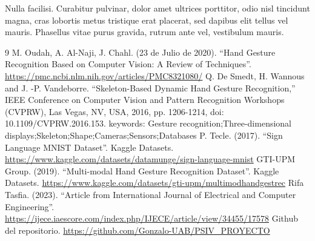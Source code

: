 \documentclass[10pt,a4paper,twocolumn,twoside]{article}
\begin{document}
Nulla facilisi. Curabitur pulvinar, dolor amet ultrices porttitor, odio nisl tincidunt magna, cras lobortis metus tristique erat placerat, sed dapibus elit tellus vel mauris. Phasellus vitae purus gravida, rutrum ante vel, vestibulum mauris. 


\begin{thebibliography}{9}
 M. Oudah, A. Al-Naji, J. Chahl. (23 de Julio de 2020). \newblock ``Hand Gesture Recognition Based on Computer Vision: A Review of Techniques''. \newblock \url{https://pmc.ncbi.nlm.nih.gov/articles/PMC8321080/}
 Q. De Smedt, H. Wannous and J. -P. Vandeborre. \newblock ``Skeleton-Based Dynamic Hand Gesture Recognition,''  IEEE Conference on Computer Vision and Pattern Recognition Workshops (CVPRW), Las Vegas, NV, USA, 2016, pp. 1206-1214, doi: 10.1109/CVPRW.2016.153. keywords: {Gesture recognition;Three-dimensional displays;Skeleton;Shape;Cameras;Sensors;Databases}
 P. Tecle. (2017). \newblock ``Sign Language MNIST Dataset''. \newblock Kaggle Datasets. \newblock \url{https://www.kaggle.com/datasets/datamunge/sign-language-mnist}
 GTI-UPM Group. (2019). \newblock ``Multi-modal Hand Gesture Recognition Dataset''. \newblock Kaggle Datasets. \newblock \url{https://www.kaggle.com/datasets/gti-upm/multimodhandgestrec}
 Rifa Tasfia. (2023). \newblock ``Article from International Journal of Electrical and Computer Engineering''. \newblock \url{https://ijece.iaescore.com/index.php/IJECE/article/view/34455/17578}
 Github del repositorio. \url{https://github.com/Gonzalo-UAB/PSIV_PROYECTO}
\end{thebibliography}
\end{document}
